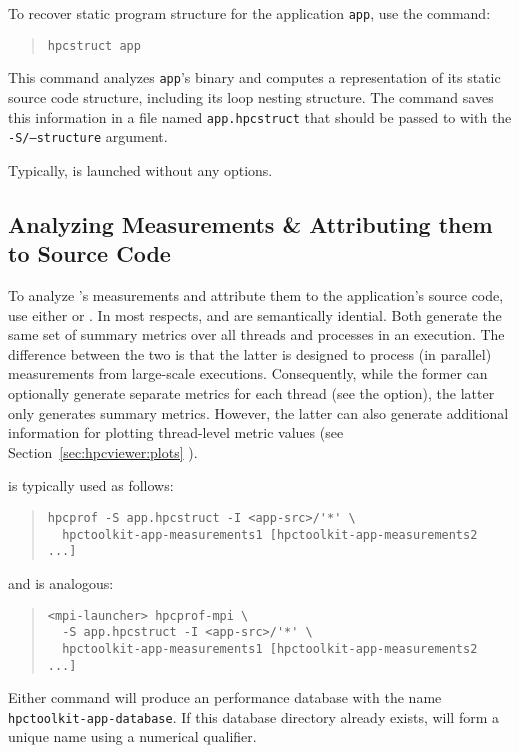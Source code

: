 \documentclass[11pt,letterpaper]{report}
\begin{document}
To recover static program structure for the application \texttt{app}, use the command:
\begin{quote}
  \verb|hpcstruct app|
\end{quote}
This command analyzes \texttt{app}'s binary and computes a representation of its static source code structure, including its loop nesting structure.
The command saves this information in a file named \texttt{app.hpcstruct} that should be passed to \hpcprof{} with the \texttt{-S/--structure} argument.

Typically, \hpcstruct{} is launched without any options.



\subsection{Analyzing Measurements \& Attributing them to Source Code}

To analyze \HPCToolkit{}'s measurements and attribute them to the application's source code, use either \hpcprof{} or \hpcprofmpi{}.
In most respects, \hpcprof{} and \hpcprofmpi{} are semantically idential.
Both generate the same set of summary metrics over all threads and processes in an execution.
The difference between the two is that the latter is designed to process (in parallel) measurements from large-scale executions.
Consequently, while the former can optionally generate separate metrics for each thread (see the  option), the latter only generates summary metrics.
However, the latter can also generate additional information for plotting thread-level metric values (see Section~\ref{sec:hpcviewer:plots}%
).

\hpcprof{} is typically used as follows:
\begin{quote}
\begin{verbatim}
hpcprof -S app.hpcstruct -I <app-src>/'*' \
  hpctoolkit-app-measurements1 [hpctoolkit-app-measurements2 ...]
\end{verbatim}
\end{quote}
and \hpcprofmpi{} is analogous:
\begin{quote}
\begin{verbatim}
<mpi-launcher> hpcprof-mpi \
  -S app.hpcstruct -I <app-src>/'*' \
  hpctoolkit-app-measurements1 [hpctoolkit-app-measurements2 ...]
\end{verbatim}
\end{quote}
Either command will produce an \HPCToolkit{} performance database with the name \texttt{hpctoolkit-app-database}.
If this database directory already exists, \hpcprofAll{} will form a unique name using a numerical qualifier.
\end{document}
